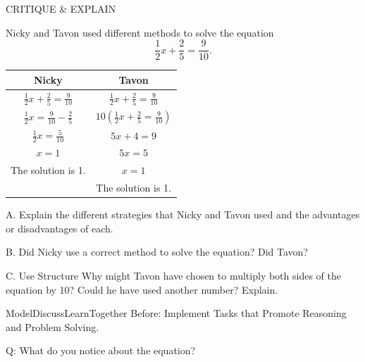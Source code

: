 \documentclass{article}
\newenvironment{model-discuss}{}{}      %
\newenvironment{te-addendum}[2]{}{}     %
\newcommand{\answer}[1]{}               %
\begin{document}
\begin{model-discuss}
CRITIQUE \& EXPLAIN

Nicky and Tavon used different methods to solve the equation
\[
\frac{1}{2}x+\frac{2}{5}=\frac{9}{10}.
\]

\begin{tabular}{cc}
\toprule
Nicky & Tavon \\
\midrule
$\frac{1}{2}x+\frac{2}{5}=\frac{9}{10}$ & $\frac{1}{2}x+\frac{2}{5}=\frac{9}{10}$ \\
$\frac{1}{2}x=\frac{9}{10}-\frac{2}{5}$ & $10\left(\frac{1}{2}x+\frac{2}{5}=\frac{9}{10}\right)$ \\
$\frac{1}{2}x=\frac{5}{10}$ & $5x+4=9$ \\
$x=1$ & $5x=5$ \\
The solution is 1. & $x=1$ \\
 & The solution is 1. \\
\bottomrule
\end{tabular}

A. Explain the different strategies that Nicky and Tavon used and the advantages or disadvantages of each.

B. Did Nicky use a correct method to solve the equation? Did Tavon?

C. Use Structure Why might Tavon have chosen to multiply both sides of the equation by 10? Could he have used another number? Explain.

\answer{A. Tavon multiplied the whole equation by 10, which gets rid of the fractions but also adds a step to solving the problem. Nicky kept the fractions, which meant having to find common denominators to do some of the solving. B. Both methods are correct. C. Tavon used 10 because it is the LCD of the fractions. He could have used another multiplier that is a common multiple of the denominators and still gotten a correct answer, but it would mean more reducing.}
\end{model-discuss}

\begin{te-addendum}{ModelDiscuss}{LearnTogether}
Before: Implement Tasks that Promote Reasoning and Problem Solving.

Q: What do you notice about the equation?
\answer{The equation is a linear equation. The coefficient of the $x$-term and the constants are fractions.}
\end{te-addendum}
\end{document}
